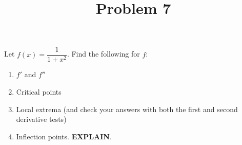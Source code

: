 \documentclass{ximera}
\title[Problem 7]{Problem 7}
\begin{document}
\begin{abstract} \end{abstract}
\maketitle

\begin{problem}
Let $f(x) = \dfrac{1}{1 + x^2}$.  Find the following for $f$:

	\begin{enumerate}
	\item  $f'$ and $f''$
	\item  Critical points
	\item  Local extrema (and check your answers with both the first and second derivative tests)
	\item  Inflection points. \textbf{EXPLAIN}.
\end{enumerate}
		
\end{problem}
\end{document}
